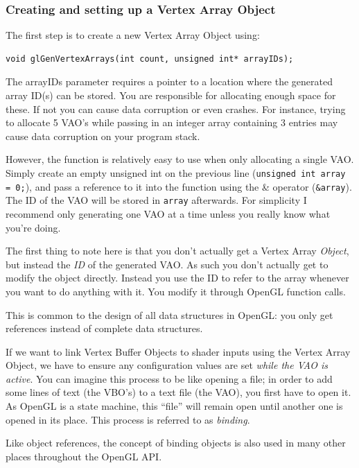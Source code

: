 \subsubsection{Creating and setting up a Vertex Array Object}

The first step is to create a new Vertex Array Object using:

\begin{verbatim}
void glGenVertexArrays(int count, unsigned int* arrayIDs);
\end{verbatim}

The arrayIDs parameter requires a pointer to a location where the generated array ID(s) can be stored. You are responsible for allocating enough space for these. If not you can cause data corruption or even crashes. For instance, trying to allocate 5 VAO's while passing in an integer array containing 3 entries may cause data corruption on your program stack.

However, the function is relatively easy to use when only allocating a single VAO. Simply create an empty unsigned int on the previous line (\texttt{unsigned int array = 0;}), and pass a reference to it into the function using the \& operator (\texttt{&array}). The ID of the VAO will be stored in \texttt{array} afterwards. For simplicity I recommend only generating one VAO at a time unless you really know what you're doing.

The first thing to note here is that you don't actually get a Vertex Array \emph{Object}, but instead the \emph{ID} of the generated VAO. As such you don't actually get to modify the object directly. Instead you use the ID to refer to the array whenever you want to do anything with it. You modify it through OpenGL function calls. 

This is common to the design of all data structures in OpenGL: you only get references instead of complete data structures.

If we want to link Vertex Buffer Objects to shader inputs using the Vertex Array Object, we have to ensure any configuration values are set \emph{while the VAO is active}. You can imagine this process to be like opening a file; in order to add some lines of text (the VBO's) to a text file (the VAO), you first have to open it. As OpenGL is a state machine, this ``file'' will remain open until another one is opened in its place. This process is referred to as \emph{binding}.

Like object references, the concept of binding objects is also used in many other places throughout the OpenGL API. 

